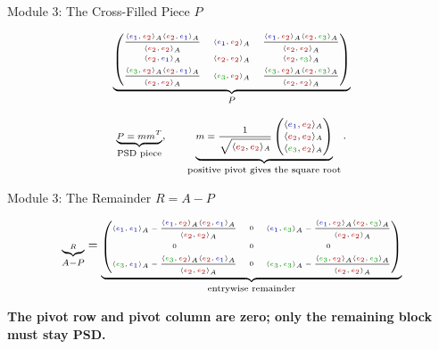 \documentclass[10pt]{beamer}
\theoremstyle{definition}
\newcommand{\x}[1]{\alert{\textbf{#1}}}
\newcommand{\rd}[1]{{\color{red!70!black}#1}}
\newcommand{\bl}[1]{{\color{blue!70!black}#1}}
\newcommand{\gn}[1]{{\color{green!60!black}#1}}
\begin{document}
\begin{frame}[shrink=8]{Module 3: The Cross-Filled Piece $P$}

\[
\tiny
\underbrace{
\begin{pmatrix}
\dfrac{\langle \bl{e_1},\rd{e_2}\rangle_A\langle \rd{e_2},\bl{e_1}\rangle_A}{\langle \rd{e_2},\rd{e_2}\rangle_A}
&
\langle \bl{e_1},\rd{e_2}\rangle_A
&
\dfrac{\langle \bl{e_1},\rd{e_2}\rangle_A\langle \rd{e_2},\gn{e_3}\rangle_A}{\langle \rd{e_2},\rd{e_2}\rangle_A}
\\[1.05em]
\langle \rd{e_2},\bl{e_1}\rangle_A
&
\langle \rd{e_2},\rd{e_2}\rangle_A
&
\langle \rd{e_2},\gn{e_3}\rangle_A
\\[0.6em]
\dfrac{\langle \gn{e_3},\rd{e_2}\rangle_A\langle \rd{e_2},\bl{e_1}\rangle_A}{\langle \rd{e_2},\rd{e_2}\rangle_A}
&
\langle \gn{e_3},\rd{e_2}\rangle_A
&
\dfrac{\langle \gn{e_3},\rd{e_2}\rangle_A\langle \rd{e_2},\gn{e_3}\rangle_A}{\langle \rd{e_2},\rd{e_2}\rangle_A}
\end{pmatrix}}_{P}
\]

\vfill

\[
\scriptsize
\underbrace{P=mm^T}_{\text{PSD piece}},
\qquad
\underbrace{m=\frac1{\sqrt{\langle \rd{e_2},\rd{e_2}\rangle_A}}
\begin{pmatrix}
\langle \bl{e_1},\rd{e_2}\rangle_A\\[0.2em]
\langle \rd{e_2},\rd{e_2}\rangle_A\\[0.2em]
\langle \gn{e_3},\rd{e_2}\rangle_A
\end{pmatrix}}_{\text{positive pivot gives the square root}}.
\]

\end{frame}


\begin{frame}[shrink=8]{Module 3: The Remainder $R=A-P$}

\[
\tiny
\underbrace{R}_{A-P}
=
\underbrace{
\begin{pmatrix}
\langle \bl{e_1},\bl{e_1}\rangle_A-\dfrac{\langle \bl{e_1},\rd{e_2}\rangle_A\langle \rd{e_2},\bl{e_1}\rangle_A}{\langle \rd{e_2},\rd{e_2}\rangle_A}
&0&
\langle \bl{e_1},\gn{e_3}\rangle_A-\dfrac{\langle \bl{e_1},\rd{e_2}\rangle_A\langle \rd{e_2},\gn{e_3}\rangle_A}{\langle \rd{e_2},\rd{e_2}\rangle_A}
\\[1.25em]
0&0&0
\\[0.6em]
\langle \gn{e_3},\bl{e_1}\rangle_A-\dfrac{\langle \gn{e_3},\rd{e_2}\rangle_A\langle \rd{e_2},\bl{e_1}\rangle_A}{\langle \rd{e_2},\rd{e_2}\rangle_A}
&0&
\langle \gn{e_3},\gn{e_3}\rangle_A-\dfrac{\langle \gn{e_3},\rd{e_2}\rangle_A\langle \rd{e_2},\gn{e_3}\rangle_A}{\langle \rd{e_2},\rd{e_2}\rangle_A}
\end{pmatrix}}_{\text{entrywise remainder}}
\]

\vfill

\begin{center}
\x{The pivot row and pivot column are zero; only the remaining block must stay PSD.}
\end{center}

\end{frame}
\end{document}
